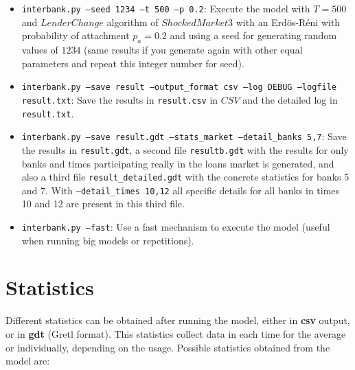 \documentclass{article}
\begin{document}
\begin{itemize}
    \item \texttt{interbank.py --seed 1234 --t 500 --p 0.2}: Execute the model with $T=500$ and $LenderChange$ algorithm of $ShockedMarket3$ with an Erdös-Réni with probability of attachment $p_a=0.2$ and using a seed for generating random values of $1234$ (same results if you generate again with other equal parameters and repeat this integer number for seed).
    \item \texttt{interbank.py --save result --output\_format csv --log DEBUG --logfile result.txt}: Save the results in \texttt{result.csv} in $CSV$ and the detailed log in \texttt{result.txt}.
    \item \texttt{interbank.py --save result.gdt --stats\_market --detail\_banks 5,7}: Save the results in \texttt{result.gdt}, a second file \texttt{resultb.gdt} with the results for only banks and times participating really in the loans market is generated, and also a third file \texttt{result\_detailed.gdt} with the concrete statistics for banks 5 and 7.
    With \texttt{--detail\_times 10,12} all specific details for all banks in times 10 and 12 are present in this third file.
    \item \texttt{interbank.py --fast}: Use a fast mechanism to execute the model (useful when running big models or repetitions).
\end{itemize}

\section{Statistics}

Different statistics can be obtained after running the model, either in \textbf{csv} output, or in \textbf{gdt} (Gretl format).
This statistics collect data in each time for the average or individually, depending on the usage. Possible statistics obtained from the model are:
\end{document}
